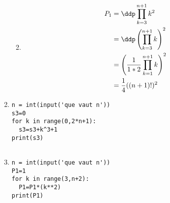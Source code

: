 \documentclass[a4paper, 11pt,reqno]{article}
\begin{document}
\begin{correction}
\begin{enumerate}
\begin{enumerate}

\item 
\begin{align*}
P_1 &= \ddp \prod_{k=3}^{n+1} k^2 \\
&=\ddp \left(\prod_{k=3}^{n+1} k\right)^2  \\
&=   \left(\frac{1}{1*2}\prod_{k=1}^{n+1} k\right)^2 \\
&=\frac{1}{4}((n+1)!)^2
\end{align*}


\end{enumerate}

\item 
\begin{lstlisting}
n = int(input('que vaut n'))
s3=0
for k in range(0,2*n+1):
  s3=s3+k^3+1
print(s3)
  
\end{lstlisting}

\item 
\begin{lstlisting}
n = int(input('que vaut n'))
P1=1
for k in range(3,n+2):
  P1=P1*(k**2)
print(P1)
  
\end{lstlisting}

\end{enumerate}


\end{correction}
\end{document}
